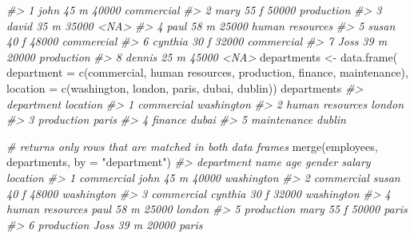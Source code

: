 \documentclass[
]{book}
\newenvironment{Shaded}{\begin{snugshade}}{\end{snugshade}}
\newcommand{\AttributeTok}[1]{\textcolor[rgb]{0.77,0.63,0.00}{#1}}
\newcommand{\CommentTok}[1]{\textcolor[rgb]{0.56,0.35,0.01}{\textit{#1}}}
\newcommand{\FunctionTok}[1]{\textcolor[rgb]{0.00,0.00,0.00}{#1}}
\newcommand{\NormalTok}[1]{#1}
\newcommand{\OtherTok}[1]{\textcolor[rgb]{0.56,0.35,0.01}{#1}}
\newcommand{\StringTok}[1]{\textcolor[rgb]{0.31,0.60,0.02}{#1}}
\begin{document}
\begin{Shaded}
\begin{Highlighting}[]
\CommentTok{\#\textgreater{} 1    john  45      m  40000      commercial}
\CommentTok{\#\textgreater{} 2    mary  55      f  50000      production}
\CommentTok{\#\textgreater{} 3   david  35      m  35000            \textless{}NA\textgreater{}}
\CommentTok{\#\textgreater{} 4    paul  58      m  25000 human resources}
\CommentTok{\#\textgreater{} 5   susan  40      f  48000      commercial}
\CommentTok{\#\textgreater{} 6 cynthia  30      f  32000      commercial}
\CommentTok{\#\textgreater{} 7    Joss  39      m  20000      production}
\CommentTok{\#\textgreater{} 8  dennis  25      m  45000            \textless{}NA\textgreater{}}
\NormalTok{departments }\OtherTok{\textless{}{-}} \FunctionTok{data.frame}\NormalTok{(}
  \AttributeTok{department =} \FunctionTok{c}\NormalTok{(}\StringTok{\textquotesingle{}commercial\textquotesingle{}}\NormalTok{, }\StringTok{\textquotesingle{}human resources\textquotesingle{}}\NormalTok{, }\StringTok{\textquotesingle{}production\textquotesingle{}}\NormalTok{, }\StringTok{\textquotesingle{}finance\textquotesingle{}}\NormalTok{, }\StringTok{\textquotesingle{}maintenance\textquotesingle{}}\NormalTok{),}
  \AttributeTok{location =} \FunctionTok{c}\NormalTok{(}\StringTok{\textquotesingle{}washington\textquotesingle{}}\NormalTok{, }\StringTok{\textquotesingle{}london\textquotesingle{}}\NormalTok{, }\StringTok{\textquotesingle{}paris\textquotesingle{}}\NormalTok{, }\StringTok{\textquotesingle{}dubai\textquotesingle{}}\NormalTok{, }\StringTok{\textquotesingle{}dublin\textquotesingle{}}\NormalTok{))}
\NormalTok{departments}
\CommentTok{\#\textgreater{}        department   location}
\CommentTok{\#\textgreater{} 1      commercial washington}
\CommentTok{\#\textgreater{} 2 human resources     london}
\CommentTok{\#\textgreater{} 3      production      paris}
\CommentTok{\#\textgreater{} 4         finance      dubai}
\CommentTok{\#\textgreater{} 5     maintenance     dublin}

\CommentTok{\# returns only rows that are matched in both data frames}
\FunctionTok{merge}\NormalTok{(employees, departments, }\AttributeTok{by =} \StringTok{"department"}\NormalTok{)}
\CommentTok{\#\textgreater{}        department    name age gender salary   location}
\CommentTok{\#\textgreater{} 1      commercial    john  45      m  40000 washington}
\CommentTok{\#\textgreater{} 2      commercial   susan  40      f  48000 washington}
\CommentTok{\#\textgreater{} 3      commercial cynthia  30      f  32000 washington}
\CommentTok{\#\textgreater{} 4 human resources    paul  58      m  25000     london}
\CommentTok{\#\textgreater{} 5      production    mary  55      f  50000      paris}
\CommentTok{\#\textgreater{} 6      production    Joss  39      m  20000      paris}
\end{Highlighting}
\end{Shaded}
\end{document}

